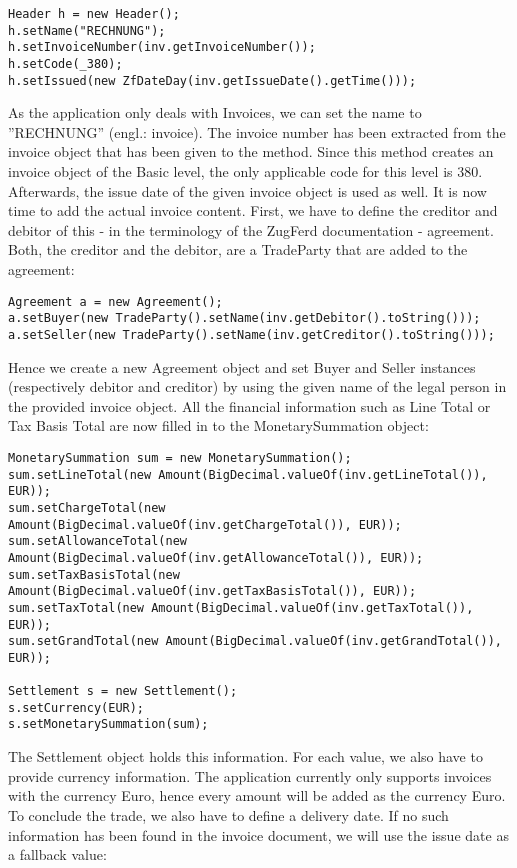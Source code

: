 \begin{lstlisting}
Header h = new Header();
h.setName("RECHNUNG");
h.setInvoiceNumber(inv.getInvoiceNumber());
h.setCode(_380);
h.setIssued(new ZfDateDay(inv.getIssueDate().getTime()));
\end{lstlisting}

As the application only deals with Invoices, we can set the name to ''RECHNUNG'' (engl.: invoice). The invoice number has been extracted from the invoice object that has been given to the method.
Since this method creates an invoice object of the Basic level, the only applicable code for this level is 380. Afterwards, the issue date of the given invoice object is used as well.
It is now time to add the actual invoice content. First, we have to define the creditor and debitor of this - in the terminology of the ZugFerd documentation - agreement. Both, the creditor and the debitor, are a TradeParty that are added to the agreement:

\begin{lstlisting}
Agreement a = new Agreement();
a.setBuyer(new TradeParty().setName(inv.getDebitor().toString()));
a.setSeller(new TradeParty().setName(inv.getCreditor().toString()));
\end{lstlisting}

Hence we create a new Agreement object and set Buyer and Seller instances (respectively debitor and creditor) by using the given name of the legal person in the provided invoice object.
All the financial information such as Line Total or Tax Basis Total are now filled in to the MonetarySummation object:

\begin{lstlisting}
MonetarySummation sum = new MonetarySummation();
sum.setLineTotal(new Amount(BigDecimal.valueOf(inv.getLineTotal()), EUR));
sum.setChargeTotal(new Amount(BigDecimal.valueOf(inv.getChargeTotal()), EUR));
sum.setAllowanceTotal(new Amount(BigDecimal.valueOf(inv.getAllowanceTotal()), EUR));
sum.setTaxBasisTotal(new Amount(BigDecimal.valueOf(inv.getTaxBasisTotal()), EUR));
sum.setTaxTotal(new Amount(BigDecimal.valueOf(inv.getTaxTotal()), EUR));
sum.setGrandTotal(new Amount(BigDecimal.valueOf(inv.getGrandTotal()), EUR));

Settlement s = new Settlement();
s.setCurrency(EUR);
s.setMonetarySummation(sum);
\end{lstlisting}

The Settlement object holds this information. For each value, we also have to provide currency information. The application currently only supports invoices with the currency Euro, hence every amount will be added as the currency Euro.
To conclude the trade, we also have to define a delivery date. If no such information has been found in the invoice document, we will use the issue date as a fallback value:

